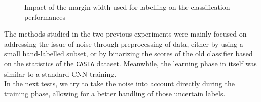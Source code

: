 \documentclass[a4paper]{article}
\begin{document}
            \begin{figure}[H]
                \centering
             	\vspace{5pt}
                \caption{Impact of the margin width used for labelling on the classification performances}
                \label{fig:marginfig1}
            \end{figure}
         
         
         The methods studied in the two previous experiments were mainly focused on addressing the issue of noise through preprocessing of data, either by using a small hand-labelled subset, or by binarizing the scores of the old classifier based on the statistics of the \texttt{CASIA} dataset. Meanwhile, the learning phase in itself was similar to a standard CNN training.\\
         In the next tests, we try to take the noise into account directly during the training phase, allowing for a better handling of those uncertain labels.
            
\end{document}
